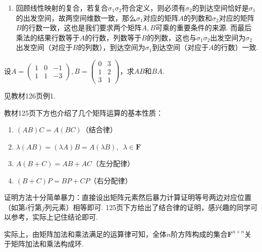 \begin{enumerate}
    \item 回顾线性映射的复合，若复合$\sigma_1\sigma_2$符合定义，则必须有$\sigma_2$的到达空间恰好是$\sigma_1$的出发空间，故两空间维数一致，那么$\sigma_1$对应的矩阵$A$的列数和$\sigma_2$对应的矩阵$B$的行数一致，这也是我们要求两个矩阵$A,B$可乘的重要条件的来源. 而最后乘法的结果行数等于$A$的行数，列数等于$B$的列数，这也与$\sigma_1\sigma_2$出发空间为$\sigma_2$出发空间（对应于$B$的列数），到达空间为$\sigma_1$到达空间（对应于$A$的行数）一致.
\end{enumerate}

\begin{example}{}{}
    设$A=\begin{pmatrix}
            1 & 0 & -1 \\
            1 & 1 & -3
        \end{pmatrix}, B=\begin{pmatrix}
            0 & 3 \\
            1 & 2 \\
            3 & 1
        \end{pmatrix}$，求$AB$和$BA$.
\end{example}

\begin{solution}
    见教材126页例1.
\end{solution}

教材125页下方也介绍了几个矩阵运算的基本性质：
\begin{enumerate}
    \item $(AB)C=A(BC)$（结合律）

    \item $\lambda(AB)=(\lambda A)B=A(\lambda B),\enspace \lambda \in \mathbf{F}$

    \item $A(B+C)=AB+AC$（左分配律）

    \item $(B+C)P=BP+CP$（右分配律）
\end{enumerate}
证明方法十分简单暴力：直接设出矩阵元素然后暴力计算证明等号两边对应位置（如第$i$行第$j$列元素）相等即可. 125页下方给出了结合律的证明，感兴趣的同学可以参考，实际上记住结论即可.

实际上，由矩阵加法和乘法满足的运算律可知，全体$n$阶方阵构成的集合$\mathbf{F}^{n\times n}$关于矩阵加法和乘法构成环.

